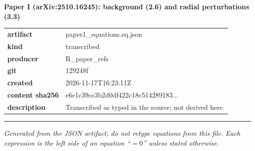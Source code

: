 \documentclass[10pt,a4paper]{article}
\begin{document}
{\Large\bfseries Paper I (arXiv:2510.16245): background (2.6) and radial perturbations (3.3)}\par
\smallskip
\begin{tabular}{@{}lp{}@{}}\textbf{artifact} & paper1\_equations.eq.json\\\textbf{kind} & transcribed\\\textbf{producer} & R\_paper\_refs\\\textbf{git} & 129248f\\\textbf{created} & 2026-11-17T16:23:11Z\\\textbf{content sha256} & e6e1c39cc3b2d0df422c18c514289183...\\\textbf{description} & Transcribed as typed in the source; not derived here.\\\end{tabular}
\par\medskip\hrule\medskip

\textit{Generated from the JSON artifact; do not retype equations from this file. Each expression is the left side of an equation ``$= 0$'' unless stated otherwise.}\par
\end{document}

